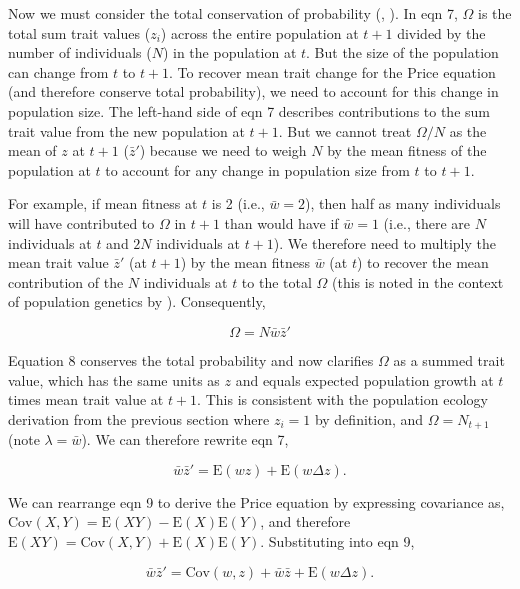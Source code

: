 \documentclass[
]{article}
\begin{document}
Now we must consider the total conservation of probability
(, ).
In eqn 7, \(\Omega\) is the total sum trait values (\(z_{i}\)) across
the entire population at \(t + 1\) divided by the number of individuals
(\(N\)) in the population at \(t\). But the size of the population can
change from \(t\) to \(t + 1\). To recover mean trait change for the
Price equation (and therefore conserve total probability), we need to
account for this change in population size. The left-hand side of eqn 7
describes contributions to the sum trait value from the new population
at \(t + 1\). But we cannot treat \(\Omega/N\) as the mean of \(z\) at
\(t+1\) (\(\bar{z}'\)) because we need to weigh \(N\) by the mean
fitness of the population at \(t\) to account for any change in
population size from \(t\) to \(t+1\).

For example, if mean fitness at \(t\) is 2 (i.e., \(\bar{w} = 2\)), then
half as many individuals will have contributed to \(\Omega\) in
\(t + 1\) than would have if \(\bar{w} = 1\) (i.e., there are \(N\)
individuals at \(t\) and \(2N\) individuals at \(t + 1\)). We therefore
need to multiply the mean trait value \(\bar{z}'\) (at \(t + 1\)) by the
mean fitness \(\bar{w}\) (at \(t\)) to recover the mean contribution of
the \(N\) individuals at \(t\) to the total \(\Omega\) (this is noted in
the context of population genetics by ). Consequently,

\[\Omega = N\bar{w}\bar{z}'
\tag{8}
\]

Equation 8 conserves the total probability and now clarifies \(\Omega\)
as a summed trait value, which has the same units as \(z\) and equals
expected population growth at \(t\) times mean trait value at \(t + 1\).
This is consistent with the population ecology derivation from the
previous section where \(z_{i} = 1\) by definition, and
\(\Omega = N_{t+1}\) (note \(\lambda = \bar{w}\)). We can therefore
rewrite eqn 7,

\[\bar{w}\bar{z}' = \mathrm{E}\left(w z \right) + \mathrm{E}\left( w \Delta z  \right).
\tag{9}
\]

We can rearrange eqn 9 to derive the Price equation by expressing
covariance as,
\(\mathrm{Cov}(X,Y) = \mathrm{E}(XY) - \mathrm{E}(X)\mathrm{E}(Y)\), and
therefore
\(\mathrm{E}(XY) = \mathrm{Cov}(X,Y) + \mathrm{E}(X)\mathrm{E}(Y)\).
Substituting into eqn 9,

\[\bar{w}\bar{z}' = \mathrm{Cov}\left(w ,z \right) + \bar{w}\bar{z} + \mathrm{E}\left( w \Delta z  \right).\]
\end{document}
